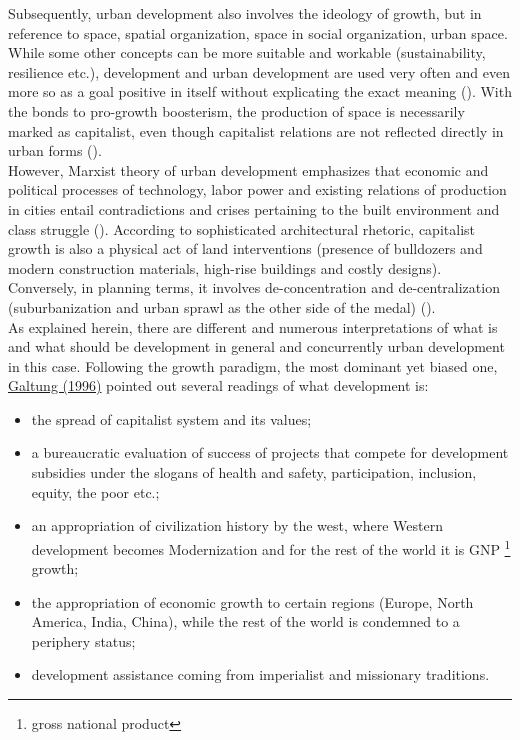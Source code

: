 \documentclass[11pt]{report}
\begin{document}
Subsequently, urban development also involves the ideology of growth, but in reference to space, spatial organization, space in social organization, urban space.
While some other concepts can be more suitable and workable (sustainability, resilience etc.), development and urban development are used very often and even more so as a goal positive in itself without explicating the exact meaning (\href{ref}{\cite{web of science results ivana popovic primer}}).
With the bonds to pro-growth boosterism, the production of space is necessarily marked as capitalist, even though capitalist relations are not reflected directly in urban forms (\href{Gottdiener}{\cite{Gottdiener1994}}). 
\\

However, Marxist theory of urban development emphasizes that economic and political processes of technology, labor power and existing relations of production in cities entail contradictions and crises pertaining to the built environment and class struggle (\href{Harvey}{\cite{Harvey1978}}).
According to sophisticated architectural rhetoric, capitalist growth is also a physical act of land interventions (presence of bulldozers and modern construction materials, high-rise buildings and costly designs).
Conversely, in planning terms, it involves de-concentration and de-centralization (suburbanization and urban sprawl as the other side of the medal) (\href{Gottdiener}{\cite{Gottdiener1994}}).
\\

As explained herein, there are different and numerous interpretations of what is and what should be development in general and concurrently urban development in this case.
Following the growth paradigm, the most dominant yet biased one, \href{Galtung}{Galtung (1996)} pointed out several readings of what development is:

\begin{itemize}
\item the spread of capitalist system and its values;
\item a bureaucratic evaluation of success of projects that compete for development subsidies under the slogans of health and safety, participation, inclusion, equity, the poor etc.;
\item an appropriation of civilization history by the west, where Western development becomes Modernization and for the rest of the world it is GNP
\footnote{gross national product}
growth; 
\item the appropriation of economic growth to certain regions (Europe, North America, India, China), while the rest of the world is condemned to a periphery status;
\item development assistance coming from imperialist and missionary traditions.
\end{itemize}
\end{document}
